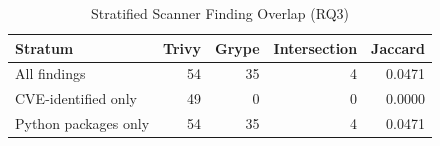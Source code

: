 \begin{table}[htbp]
\caption{Stratified Scanner Finding Overlap (RQ3)}
\label{tab:scanner-agreement-stratified}
\centering\small
\begin{tabular}{lrrrr}
\toprule
\textbf{Stratum} & \textbf{Trivy} & \textbf{Grype} & \textbf{Intersection} & \textbf{Jaccard} \\
\midrule
  All findings & 54 & 35 & 4 & 0.0471 \\
  CVE-identified only & 49 & 0 & 0 & 0.0000 \\
  Python packages only & 54 & 35 & 4 & 0.0471 \\
\bottomrule
\end{tabular}
\end{table}